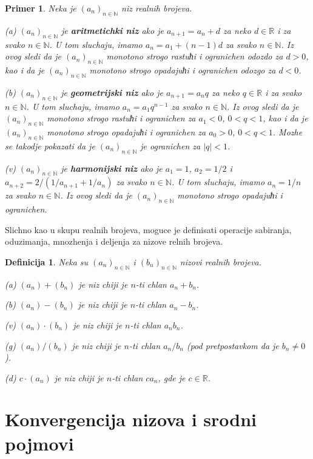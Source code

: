 \documentclass[11pt,a4paper]{article}
\newtheorem{defi}{Definicija}[section]
\newtheorem{pri}{Primer}[section]
\begin{document}
\begin{pri}
Neka je $(a_n)_{n\in\mathbb{N}}$ niz realnih brojeva. 

(a) $(a_n)_{n\in\mathbb{N}}$ je {\bf aritmetichki niz} 
ako je $a_{n+1}=a_{n}+d$ za neko $d\in\mathbb{R}$ i za svako 
$n\in\mathbb{N}$. 
U tom sluchaju, imamo $a_n=a_1+(n-1)d$ za svako $n\in\mathbb{N}$.  
Iz ovog sledi da je $(a_n)_{n\in\mathbb{N}}$ monotono strogo 
rastuћi i ogranichen odozdo za $d>0$, kao i da je 
$(a_n)_{n\in\mathbb{N}}$ monotono strogo 
opadajuћi i ogranichen odozgo za $d<0$. 

(b) $(a_n)_{n\in\mathbb{N}}$ je {\bf geometrijski niz} 
ako je $a_{n+1}=a_{n}q$ za neko $q\in\mathbb{R}$ i za svako 
$n\in\mathbb{N}$. 
U tom sluchaju, imamo $a_n=a_1q^{n-1}$ za svako $n\in\mathbb{N}$.  
Iz ovog sledi da je $(a_n)_{n\in\mathbb{N}}$ monotono strogo 
rastuћi i ogranichen za $a_1<0$, $0<q<1$, kao i da je 
$(a_n)_{n\in\mathbb{N}}$ monotono strogo 
opadajuћi i ogranichen za $a_0>0$, $0<q<1$.
Mozhe se takodje pokazati da je $(a_n)_{n\in\mathbb{N}}$ je ogranichen 
za $|q|<1$. 

(v) $(a_n)_{n\in\mathbb{N}}$ je {\bf harmonijski niz} 
ako je $a_1=1$, $a_2=1/2$ i $a_{n+2}=2/(1/a_{n+1}+1/a_n)$ za svako 
$n\in\mathbb{N}$. 
U tom sluchaju, imamo $a_n=1/n$ za svako $n\in\mathbb{N}$.  
Iz ovog sledi da je $(a_n)_{n\in\mathbb{N}}$ monotono strogo 
opadajuћi i ogranichen. 
\end{pri}

Slichno kao u skupu realnih brojeva, 
moguce je definisati operacije sabiranja, oduzimanja, mnozhenja i 
deljenja za nizove relnih brojeva. 

\begin{defi}
Neka su $(a_n)_{n\in\mathbb{N}}$ i $(b_n)_{n\in\mathbb{N}}$
nizovi realnih brojeva. 

(a) $(a_n)+(b_n)$ je niz chiji je $n$-ti chlan 
$a_n+b_n$. 

(b) $(a_n)-(b_n)$ je niz chiji je $n$-ti chlan 
$a_n-b_n$. 

(v) $(a_n)\cdot(b_n)$ je niz chiji je $n$-ti chlan 
$a_nb_n$. 

(g) $(a_n)/(b_n)$ je niz chiji je $n$-ti chlan 
$a_n/b_n$ (pod pretpostavkom da je $b_n\neq 0$). 

(d) $c\cdot(a_n)$ je niz chiji je $n$-ti chlan 
$ca_n$, gde je $c\in\mathbb{R}$. 
\end{defi}

\section{Konvergencija nizova i srodni pojmovi} \label{section2}
\end{document}
